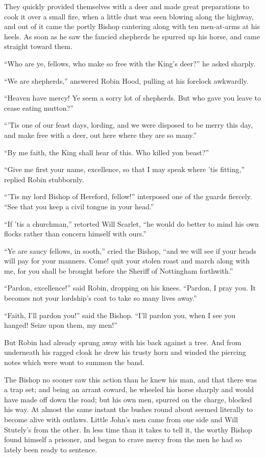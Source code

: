 They quickly provided themselves with a deer and made great preparations
to cook it over a small fire, when a little dust was seen blowing along
the highway, and out of it came the portly Bishop cantering along with
ten men-at-arms at his heels. As soon as he saw the fancied shepherds he
spurred up his horse, and came straight toward them.

``Who are ye, fellows, who make so free with the King's deer?'' he asked
sharply.

``We are shepherds,'' answered Robin Hood, pulling at his forelock
awkwardly.

``Heaven have mercy! Ye seem a sorry lot of shepherds. But who gave you
leave to cease eating mutton?''

``'Tis one of our feast days, lording, and we were disposed to be merry
this day, and make free with a deer, out here where they are so many.''

``By me faith, the King shall hear of this. Who killed yon beast?''

``Give me first your name, excellence, so that I may speak where 'tis
fitting,'' replied Robin stubbornly.

``'Tis my lord Bishop of Hereford, fellow!'' interposed one of the
guards fiercely. ``See that you keep a civil tongue in your head.''

``If 'tis a churchman,'' retorted Will Scarlet, ``he would do better to
mind his own flocks rather than concern himself with ours.''

``Ye are saucy fellows, in sooth,'' cried the Bishop, ``and we will see
if your heads will pay for your manners. Come! quit your stolen roast
and march along with me, for you shall be brought before the Sheriff of
Nottingham forthwith.''

``Pardon, excellence!'' said Robin, dropping on his knees. ``Pardon, I
pray you. It becomes not your lordship's coat to take so many lives
away.''

``Faith, I'll pardon you!'' said the Bishop. ``I'll pardon you, when I
see you hanged! Seize upon them, my men!''

But Robin had already sprung away with his back against a tree. And from
underneath his ragged cloak he drew his trusty horn and winded the
piercing notes which were wont to summon the band.

The Bishop no sooner saw this action than he knew his man, and that
there was a trap set; and being an arrant coward, he wheeled his horse
sharply and would have made off down the road; but his own men, spurred
on the charge, blocked his way. At almost the same instant the bushes
round about seemed literally to become alive with outlaws. Little John's
men came from one side and Will Stutely's from the other. In less time
than it takes to tell it, the worthy Bishop found himself a prisoner,
and began to crave mercy from the men he had so lately been ready to
sentence.

